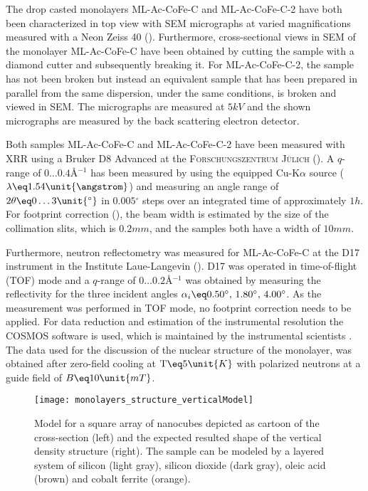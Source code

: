 \documentclass[\main/dresen_thesis.tex]{subfiles}
\begin{document}
    The drop casted monolayers ML-Ac-CoFe-C and ML-Ac-CoFe-C-2 have both been characterized in top view with SEM micrographs at varied magnifications measured with a Neon Zeiss 40 ().
    Furthermore, cross-sectional views in SEM of the monolayer ML-Ac-CoFe-C have been obtained by cutting the sample with a diamond cutter and subsequently breaking it.
    For ML-Ac-CoFe-C-2, the sample has not been broken but instead an equivalent sample that has been prepared in parallel from the same dispersion, under the same conditions, is broken and viewed in SEM.
    The micrographs are measured at $5 \unit{kV}$ and the shown micrographs are measured by the back scattering electron detector.

    Both samples ML-Ac-CoFe-C and ML-Ac-CoFe-C-2 have been measured with XRR using a Bruker D8 Advanced at the \textsc{Forschungszentrum J\"ulich} ().
    A $q$-range of $0 \ldots 0.4 \unit{\angstrom^{-1}}$ has been measured by using the equipped Cu-K$\alpha$ source ($\lambda \eq 1.54 \unit{\angstrom}$) and measuring an angle range of $2 \theta \eq 0 \ldots 3 \unit{^\circ}$ in $0.005 \unit{^\circ}$ steps over an integrated time of approximately $1 \unit{h}$.
    For footprint correction (), the beam width is estimated by the size of the collimation slits, which is $0.2 \unit{mm}$, and the samples both have a width of $10 \unit{mm}$.

    Furthermore, neutron reflectometry was measured for ML-Ac-CoFe-C at the D17 instrument in the Institute Laue-Langevin ().
    D17 was operated in time-of-flight (TOF) mode and a $q$-range of $0 \ldots 0.2 \unit{\angstrom^{-1}}$ was obtained by measuring the reflectivity for the three incident angles $\alpha_i \eq 0.50^\circ ,\, 1.80^\circ ,\, 4.00^\circ$.
    As the measurement was performed in TOF mode, no footprint correction needs to be applied.
    For data reduction and estimation of the instrumental resolution the COSMOS software is used, which is maintained by the instrumental scientists \cite{Gutfreund_2018_Towar}.
    The data used for the discussion of the nuclear structure of the monolayer, was obtained after zero-field cooling at $\mathrm{T} \eq 5 \unit{K}$ with polarized neutrons at a guide field of $B \eq 10 \unit{mT}$.

    \begin{figure}[tb]
      \centering
      \texttt{[image: monolayers\_structure\_verticalModel]}
      \caption{\label{fig:monolayers:structure:verticalModel}Model for a square array of nanocubes depicted as cartoon of the cross-section (left) and the expected resulted shape of the vertical density structure (right). The sample can be modeled by a layered system of silicon (light gray), silicon dioxide (dark gray), oleic acid (brown) and cobalt ferrite (orange). }
    \end{figure}
\end{document}
